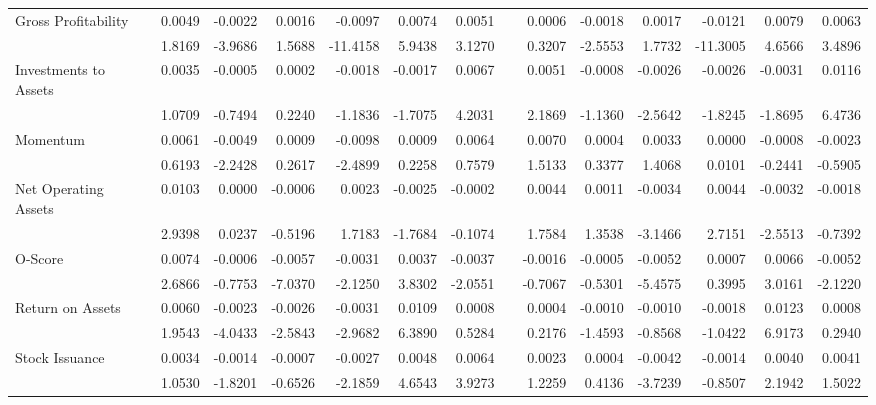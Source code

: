 \begin{table}[h]
{\begin{tabular}{lrrrrrrrrrrrrr}
      Gross Profitability & 0.0049 & -0.0022 & 0.0016 & -0.0097 & 0.0074 & 0.0051 &       & 0.0006 & -0.0018 & 0.0017 & -0.0121 & 0.0079 & 0.0063 \\
            & 1.8169 & -3.9686 & 1.5688 & -11.4158 & 5.9438 & 3.1270 &       & 0.3207 & -2.5553 & 1.7732 & -11.3005 & 4.6566 & 3.4896 \\
      Investments to Assets & 0.0035 & -0.0005 & 0.0002 & -0.0018 & -0.0017 & 0.0067 &       & 0.0051 & -0.0008 & -0.0026 & -0.0026 & -0.0031 & 0.0116 \\
            & 1.0709 & -0.7494 & 0.2240 & -1.1836 & -1.7075 & 4.2031 &       & 2.1869 & -1.1360 & -2.5642 & -1.8245 & -1.8695 & 6.4736 \\
      Momentum & 0.0061 & -0.0049 & 0.0009 & -0.0098 & 0.0009 & 0.0064 &       & 0.0070 & 0.0004 & 0.0033 & 0.0000 & -0.0008 & -0.0023 \\
            & 0.6193 & -2.2428 & 0.2617 & -2.4899 & 0.2258 & 0.7579 &       & 1.5133 & 0.3377 & 1.4068 & 0.0101 & -0.2441 & -0.5905 \\
      Net Operating Assets & 0.0103 & 0.0000 & -0.0006 & 0.0023 & -0.0025 & -0.0002 &       & 0.0044 & 0.0011 & -0.0034 & 0.0044 & -0.0032 & -0.0018 \\
            & 2.9398 & 0.0237 & -0.5196 & 1.7183 & -1.7684 & -0.1074 &       & 1.7584 & 1.3538 & -3.1466 & 2.7151 & -2.5513 & -0.7392 \\
      O-Score & 0.0074 & -0.0006 & -0.0057 & -0.0031 & 0.0037 & -0.0037 &       & -0.0016 & -0.0005 & -0.0052 & 0.0007 & 0.0066 & -0.0052 \\
            & 2.6866 & -0.7753 & -7.0370 & -2.1250 & 3.8302 & -2.0551 &       & -0.7067 & -0.5301 & -5.4575 & 0.3995 & 3.0161 & -2.1220 \\
      Return on Assets & 0.0060 & -0.0023 & -0.0026 & -0.0031 & 0.0109 & 0.0008 &       & 0.0004 & -0.0010 & -0.0010 & -0.0018 & 0.0123 & 0.0008 \\
            & 1.9543 & -4.0433 & -2.5843 & -2.9682 & 6.3890 & 0.5284 &       & 0.2176 & -1.4593 & -0.8568 & -1.0422 & 6.9173 & 0.2940 \\
      Stock Issuance & 0.0034 & -0.0014 & -0.0007 & -0.0027 & 0.0048 & 0.0064 &       & 0.0023 & 0.0004 & -0.0042 & -0.0014 & 0.0040 & 0.0041 \\
            & 1.0530 & -1.8201 & -0.6526 & -2.1859 & 4.6543 & 3.9273 &       & 1.2259 & 0.4136 & -3.7239 & -0.8507 & 2.1942 & 1.5022 \\
      \bottomrule
      \end{tabular}%
    }
    \label{tab:vol-ff5}%
  \end{table}%

